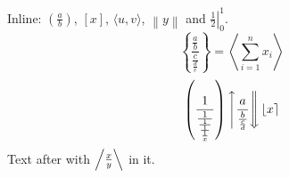 \documentclass{article}
\begin{document}
Inline: $\left( \frac{a}{b} \right)$, $\left[ x \right]$, $\langle u, v\rangle$, $\left\| y \right\|$ and $\left. \frac{1}{2} \right|_0^1$.
\[ \left\{ \frac{\frac{a}{b}}{\frac{c}{\frac{d}{e}}} \right\} = \left\langle \sum_{i=1}^n x_i \right\rangle \]
\[ \left( \frac{1}{\frac{1}{\frac{1}{\frac{1}{\frac{1}{x}}}}} \right) \left\uparrow \frac{a}{\frac{b}{\frac{c}{d}}} \right\Downarrow \left\lfloor x \right\rceil \]
Text after with $\left/ \frac{x}{y} \right\backslash$ in it.
\end{document}
